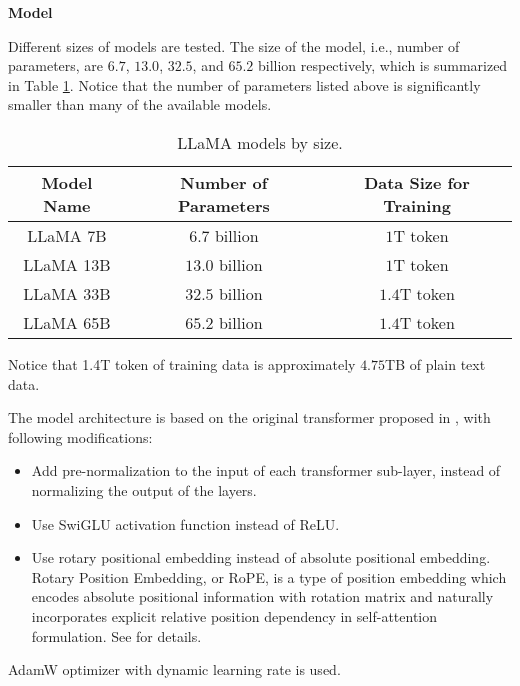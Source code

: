 \vspace{0.1in}
\noindent \textbf{Model}
\vspace{0.1in}

Different sizes of models are tested. The size of the model, i.e., number of parameters, are $6.7$, $13.0$, $32.5$, and $65.2$ billion respectively, which is summarized in Table \ref{tab:llama:models}. Notice that the number of parameters listed above is significantly smaller than many of the available models.

\begin{table}[htbp]
	\centering
	\caption{LLaMA models by size.} \label{tab:llama:models}
	\begin{tabular}{|c|c|c|}
		\hline
		Model Name & Number of Parameters & Data Size for Training \\ \hline
        LLaMA 7B & $6.7$ billion & $1$T token \\ \hline
        LLaMA 13B & $13.0$ billion & $1$T token \\ \hline
        LLaMA 33B & $32.5$ billion & $1.4$T token \\ \hline
        LLaMA 65B & $65.2$ billion & $1.4$T token \\ \hline
	\end{tabular}
\begin{flushleft}
  Notice that 1.4T token of training data is approximately $4.75$TB of plain text data.
\end{flushleft}
\end{table}

The model architecture is based on the original transformer proposed in \cite{vaswani2017attention}, with following modifications:
\begin{itemize}
	\item Add pre-normalization to the input of each transformer sub-layer, instead of normalizing the output of the layers.
	\item Use SwiGLU activation function instead of ReLU.
	\item Use rotary positional embedding instead of absolute positional embedding. Rotary Position Embedding, or RoPE, is a type of position embedding which encodes absolute positional information with rotation matrix and naturally incorporates explicit relative position dependency in self-attention formulation. See \cite{su2022roformer} for details.
\end{itemize}

AdamW optimizer with dynamic learning rate is used.


